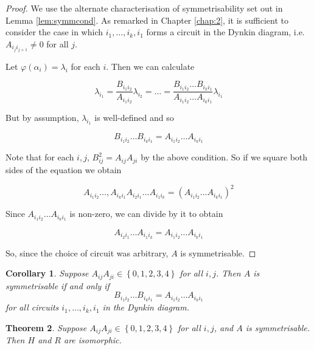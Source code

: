 \documentclass[11pt,a4paper]{report}
\newtheorem{theorem}{Theorem}[chapter]
\newtheorem{corollary}[theorem]{Corollary}
\theoremstyle{definition}
\begin{document}
\begin{proof} We use the alternate characterisation of symmetrisability set out in Lemma \ref{lem:symmcond}. As remarked in Chapter \ref{chap:2}, it is sufficient to consider the case in which $i_1, \ldots, i_k, i_1$ forms a circuit in the Dynkin diagram, i.e. $A_{i_j i_{j+1}} \neq 0$ for all $j$.

Let $\varphi(\alpha_i) = \lambda_i$ for each $i$. Then we can calculate 

\begin{equation*}\lambda_{i_1} = \dfrac{B_{i_1i_2}}{A_{i_1i_2}} \lambda_{i_2} = \ldots = \dfrac{ B_{i_1i_2} \ldots B_{i_k i_1}}{A_{i_1i_2} \ldots A_{i_k i_1}} \lambda_{i_1}\end{equation*}

But by assumption, $\lambda_{i_1}$ is well-defined and so

\begin{equation*}
    B_{i_1i_2} \ldots B_{i_k i_1} = A_{i_1i_2} \ldots A_{i_k i_1}
\end{equation*}

Note that for each $i, j$, $B_{ij}^2 = A_{ij} A_{ji}$ by the above condition. So if we square both sides of the equation we obtain 

\begin{equation*}A_{i_1i_2} \ldots, A_{i_k i_1} A_{i_2 i_1} \ldots A_{i_1 i_k} = (A_{i_1i_2} \ldots A_{i_k i_1})^2\end{equation*}

Since $A_{i_1i_2} \ldots A_{i_k i_1}$ is non-zero, we can divide by it to obtain

\begin{equation*}  A_{i_2 i_1} \ldots A_{i_1 i_k}= A_{i_1i_2} \ldots A_{i_k i_1}\end{equation*}

So, since the choice of circuit was arbitrary, $A$ is symmetrisable. \end{proof}

\begin{corollary} \label{cor:symmreflectcond} Suppose $A_{ij} A_{ji} \in \left\{0,1,2,3,4\right\}$ for all $i, j$. Then $A$ is symmetrisable if and only if \begin{equation*}
    B_{i_1i_2} \ldots B_{i_k i_1} = A_{i_1i_2} \ldots A_{i_k i_1}
\end{equation*} for all circuits $i_1, \ldots, i_k, i_1$ in the Dynkin diagram. \end{corollary}

\begin{theorem} \label{thm:reflectisomorph} Suppose $A_{ij} A_{ji} \in \left\{0,1,2,3,4\right\}$ for all $i, j$, and $A$ is symmetrisable. Then $H$ and $R$ are isomorphic.\end{theorem}
\end{document}
